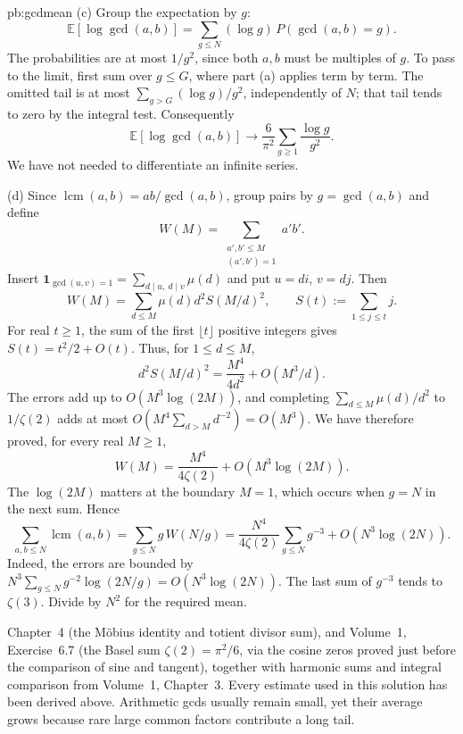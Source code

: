 \begin{solution}{pb:gcdmean}
(c) Group the expectation by $g$:
\[
\mathbb E[\log\gcd(a,b)]
=\sum_{g\le N}(\log g)\,P(\gcd(a,b)=g).
\]
The probabilities are at most $1/g^2$, since both $a,b$ must be
multiples of $g$. To pass to the limit, first sum over $g\le G$,
where part (a) applies term by term. The omitted tail is at most
$\sum_{g>G}(\log g)/g^2$, independently of $N$; that tail tends
to zero by the integral test. Consequently
\[
\mathbb E[\log\gcd(a,b)]\longrightarrow
\frac6{\pi^2}\sum_{g\ge1}\frac{\log g}{g^2}.
\]
We have not needed to differentiate an infinite series.

(d) Since $\operatorname{lcm}(a,b)=ab/\gcd(a,b)$, group pairs by $g=\gcd(a,b)$ and define
\[
W(M)=\sum_{\substack{a',b'\le M\\(a',b')=1}}a'b'.
\]
Insert $\mathbf1_{\gcd(u,v)=1}=\sum_{d\mid u,\ d\mid v}\mu(d)$
and put $u=di$, $v=dj$. Then
\[
W(M)=\sum_{d\le M}\mu(d)d^2S(M/d)^2,
\qquad S(t):=\sum_{1\le j\le t}j.
\]
For real $t\ge1$, the sum of the first $\lfloor t\rfloor$
positive integers gives $S(t)=t^2/2+O(t)$.
Thus, for $1\le d\le M$,
\[
d^2S(M/d)^2=\frac{M^4}{4d^2}+O(M^3/d).
\]
The errors add up to $O(M^3\log(2M))$, and completing
$\sum_{d\le M}\mu(d)/d^2$ to $1/\zeta(2)$ adds at most
$O(M^4\sum_{d>M}d^{-2})=O(M^3)$.
We have therefore proved, for every real $M\ge1$,
\[
W(M)=\frac{M^4}{4\zeta(2)}+O(M^3\log(2M)).
\]
The $\log(2M)$ matters at the boundary $M=1$, which
occurs when $g=N$ in the next sum. Hence
\[
\sum_{a,b\le N}\operatorname{lcm}(a,b)
=\sum_{g\le N}g\,W(N/g)
=\frac{N^4}{4\zeta(2)}\sum_{g\le N}g^{-3}
+O(N^3\log(2N)).
\]
Indeed, the errors are bounded by
$N^3\sum_{g\le N}g^{-2}\log(2N/g)
=O(N^3\log(2N))$.
The last sum of $g^{-3}$ tends to $\zeta(3)$.
Divide by $N^2$ for the required mean.

\tools Chapter~4 (the M\"obius identity and totient divisor sum), and Volume~1, Exercise~6.7 (the Basel sum $\zeta(2)=\pi^2/6$, via the cosine zeros proved just before the comparison of sine and tangent), together with harmonic sums and integral comparison from Volume~1, Chapter~3. Every estimate used in this solution has been derived above.
\leads Arithmetic gcds usually remain small, yet their average grows because rare large common factors contribute a long tail.
\end{solution}

